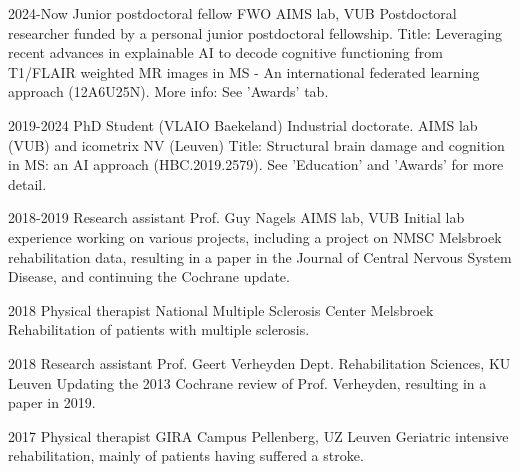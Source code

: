 
\begin{cvskills}

  \cvskill
    {2024-Now} %
    {Junior postdoctoral fellow FWO} %
    {AIMS lab, VUB} %
  \cvskillextended
    {}
    {Postdoctoral researcher funded by a personal junior postdoctoral fellowship. Title: Leveraging recent advances in explainable AI to decode cognitive functioning from T1/FLAIR weighted MR images in MS - An international federated learning approach (12A6U25N). More info: See 'Awards' tab.} %
    {}


  \cvskill
    {2019-2024} %
    {PhD Student (VLAIO Baekeland)} %
    {Industrial doctorate. AIMS lab (VUB) and icometrix NV (Leuven)} %
  \cvskillextended
    {}
    {Title: Structural brain damage and cognition in MS: an AI approach (HBC.2019.2579). See 'Education' and 'Awards' for more detail.} %
    {}


  \cvskill
    {2018-2019} %
    {Research assistant Prof. Guy Nagels} %
    {AIMS lab, VUB} %
  \cvskillextended
    {}
    {Initial lab experience working on various projects, including a project on NMSC Melsbroek rehabilitation data, resulting in a paper in the Journal of Central Nervous System Disease, and continuing the Cochrane update.} %
    {}


  \cvskill
    {2018} %
    {Physical therapist} %
    {National Multiple Sclerosis Center Melsbroek} %
  \cvskillextended
    {}
    {Rehabilitation of patients with multiple sclerosis.} %
    {}


  \cvskill
    {2018} %
    {Research assistant Prof. Geert Verheyden} %
    {Dept. Rehabilitation Sciences, KU Leuven} %
  \cvskillextended
    {}
    {Updating the 2013 Cochrane review of Prof. Verheyden, resulting in a paper in 2019.} %
    {}


  \cvskill
    {2017} %
    {Physical therapist} %
    {GIRA Campus Pellenberg, UZ Leuven} %
  \cvskillextended
    {}
    {Geriatric intensive rehabilitation, mainly of patients having suffered a stroke.} %
    {}


\end{cvskills}